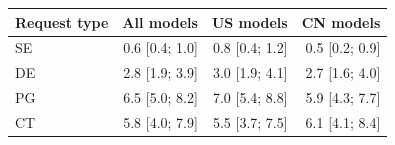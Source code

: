 \begin{tabular}{lrrr}
\toprule
Request type & All models & US models & CN models \\
\midrule
SE & 0.6 [0.4; 1.0] & 0.8 [0.4; 1.2] & 0.5 [0.2; 0.9] \\
DE & 2.8 [1.9; 3.9] & 3.0 [1.9; 4.1] & 2.7 [1.6; 4.0] \\
PG & 6.5 [5.0; 8.2] & 7.0 [5.4; 8.8] & 5.9 [4.3; 7.7] \\
CT & 5.8 [4.0; 7.9] & 5.5 [3.7; 7.5] & 6.1 [4.1; 8.4] \\
\bottomrule
\end{tabular}

